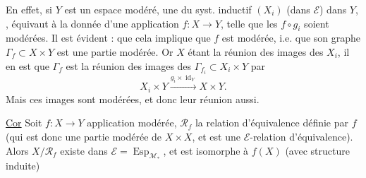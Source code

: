 En effet, si $Y$ est un espace modéré, une   du syst. inductif $(X_i)$ (dans $\mathcal E$) dans $Y$, , équivaut à la donnée d'une application $f:X\longrightarrow Y$, telle que les $f\circ g_i$ soient modérées. Il est évident :  que cela implique que $f$ est modérée, i.e. que son graphe $\Gamma_f\subset X\times Y$ est une partie modérée. Or $X$ étant la réunion des images des $X_i$, il en est que $\Gamma_f$ est la réunion des images des $\Gamma_{f_i}\subset X_i\times Y$ par
\[
 X_i\times Y\xrightarrow{g_i\times\operatorname{id}_Y}X\times Y.
\]
Mais ces images sont modérées, et donc leur réunion aussi.

\uline{Cor} Soit $f:X\longrightarrow Y$ application modérée, $\mathcal R_f$ la relation d'équivalence définie par $f$ (qui est donc une partie modérée de $X\times X$, et est une $\mathcal E$-relation d'équivalence). Alors $X/\mathcal R_f$ existe dans $\mathcal E=\operatorname{Esp}_{\mathcal M_*}$, et est  isomorphe à $f(X)$ (avec structure induite)

